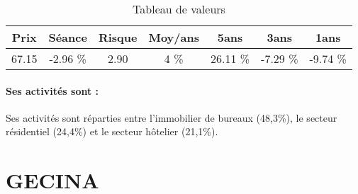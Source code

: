 \documentclass[11pt,a4paper]{report}%
\begin{document}
\begin{table}[H]
  \centering
    \begin{tabular}{|c|c|c|c|c|c|c|}
    \hline
    Prix & Séance & Risque  & Moy/ans & 5ans & 3ans & 1ans \\
    \hline
    67.15 &    -2.96 \%    & 2.90 & 4 \% & 26.11 \% & -7.29 \% & -9.74 \% \\
    \hline
    \end{tabular}%
        \label{tab:table_COVIVIO}%
      \caption{Tableau de valeurs}
\end{table}%

\paragraph{Ses activités sont : } Ses activités sont réparties entre l'immobilier de bureaux (48,3\%), le secteur résidentiel (24,4\%) et le secteur hôtelier (21,1\%).  
    
    \newpage

\section{GECINA}
\end{document}
